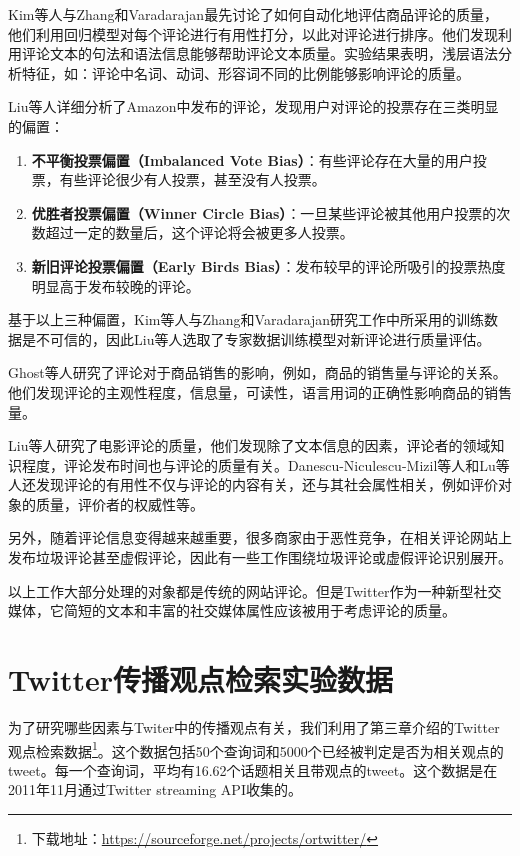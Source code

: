 Kim等人与Zhang和Varadarajan最先讨论了如何自动化地评估商品评论的质量，他们利用回归模型对每个评论进行有用性打分，以此对评论进行排序。他们发现利用评论文本的句法和语法信息能够帮助评论文本质量。实验结果表明，浅层语法分析特征，如：评论中名词、动词、形容词不同的比例能够影响评论的质量。

Liu等人详细分析了Amazon中发布的评论，发现用户对评论的投票存在三类明显的偏置：
  \begin{enumerate}
  \item {\textbf{不平衡投票偏置（Imbalanced Vote Bias）}}：有些评论存在大量的用户投票，有些评论很少有人投票，甚至没有人投票。
  \item {\textbf{优胜者投票偏置（Winner Circle Bias）}}：一旦某些评论被其他用户投票的次数超过一定的数量后，这个评论将会被更多人投票。
  \item {\textbf{新旧评论投票偏置（Early Birds Bias）}}：发布较早的评论所吸引的投票热度明显高于发布较晚的评论。
  \end{enumerate} 
基于以上三种偏置，Kim等人与Zhang和Varadarajan研究工作中所采用的训练数据是不可信的，因此Liu等人选取了专家数据训练模型对新评论进行质量评估。

Ghost等人研究了评论对于商品销售的影响，例如，商品的销售量与评论的关系。他们发现评论的主观性程度，信息量，可读性，语言用词的正确性影响商品的销售量。

Liu等人研究了电影评论的质量，他们发现除了文本信息的因素，评论者的领域知识程度，评论发布时间也与评论的质量有关。Danescu-Niculescu-Mizil等人和Lu等人还发现评论的有用性不仅与评论的内容有关，还与其社会属性相关，例如评价对象的质量，评价者的权威性等。

另外，随着评论信息变得越来越重要，很多商家由于恶性竞争，在相关评论网站上发布垃圾评论甚至虚假评论，因此有一些工作围绕垃圾评论或虚假评论识别展开。

以上工作大部分处理的对象都是传统的网站评论。但是Twitter作为一种新型社交媒体，它简短的文本和丰富的社交媒体属性应该被用于考虑评论的质量。

\section{Twitter传播观点检索实验数据}
为了研究哪些因素与Twiter中的传播观点有关，我们利用了第三章介绍的Twitter观点检索数据\footnote{下载地址：\url{https://sourceforge.net/projects/ortwitter/}}。这个数据包括50个查询词和5000个已经被判定是否为相关观点的tweet。每一个查询词，平均有16.62个话题相关且带观点的tweet。这个数据是在2011年11月通过Twitter streaming API收集的。

